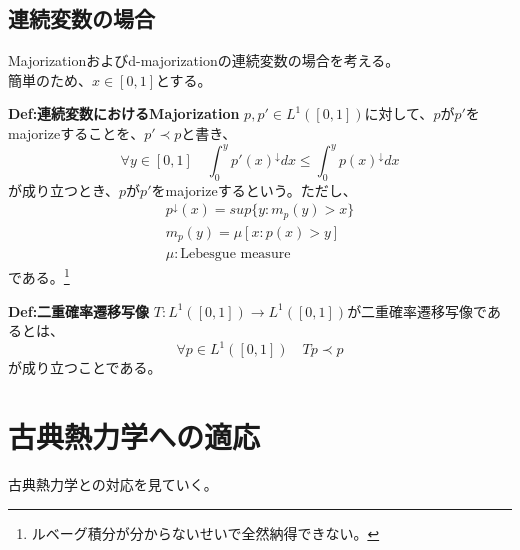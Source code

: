 \documentclass[a4paper,11pt]{jsarticle}
\numberwithin{equation}{section}
\begin{document}
\subsection{連続変数の場合}
Majorizationおよびd-majorizationの連続変数の場合を考える。\\
簡単のため、$x\in[0,1]$とする。

\begin{itembox}[l]{\textbf{Def:連続変数におけるMajorization}}
    $p,p' \in L^1([0,1])$に対して、$p$が$p'$をmajorizeすることを、$p' \prec p$と書き、
    \begin{equation}
        \forall y \in [0,1] \quad \int_{0}^{y}{p'}(x)^{\downarrow}dx \leq \int_{0}^{y}p(x)^{\downarrow}dx
    \end{equation}
    が成り立つとき、$p$が$p'$をmajorizeするという。ただし、
    \begin{align}
        p^{\downarrow}(x) =sup\{y: m_p(y) >x\}\\
        m_p(y) = \mu[x:p(x)>y]\\
        \mu : \text{Lebesgue measure}
    \end{align}
    である。\footnote[1]{ルベーグ積分が分からないせいで全然納得できない。}
\end{itembox}

\begin{itembox}[l]{\textbf{Def:二重確率遷移写像}}
    $T:L^1([0,1]) \to L^1([0,1])$が二重確率遷移写像であるとは、
    \begin{equation}
        \forall p \in L^1([0,1]) \quad Tp \prec p
    \end{equation}
    が成り立つことである。
\end{itembox}

\newpage
\section{古典熱力学への適応}
古典熱力学との対応を見ていく。
\end{document}

